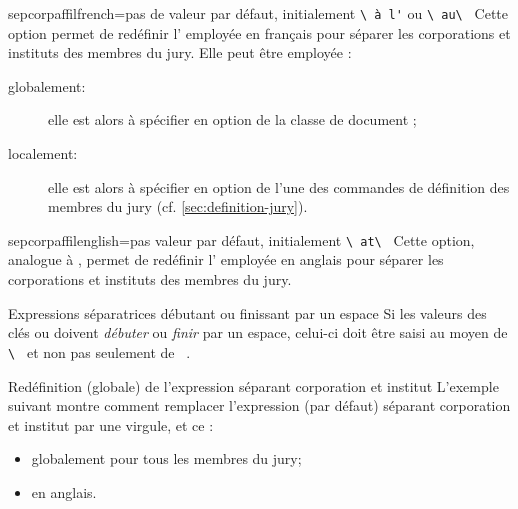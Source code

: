 \begin{docKey}{sepcorpaffilfrench}{=}{pas de valeur par
    défaut, initialement \lstinline[showspaces]+\ à l'+ ou \lstinline[showspaces]+\ au\ +}
  Cette option permet de redéfinir l' employée en français
  pour séparer les corporations et instituts des membres du jury. Elle peut
  être employée :
  \begin{description}
  \item[globalement:] elle est alors à spécifier en option de la classe de
    document ;
  \item[localement:] elle est alors à spécifier en option de l'une des
    commandes de définition des membres du jury (cf.
    \vref{sec:definition-jury}).
  \end{description}
\end{docKey}

\begin{docKey}{sepcorpaffilenglish}{=}{pas valeur par
    défaut, initialement \lstinline[showspaces]+\ at\ +}
  Cette option, analogue à , permet de redéfinir
  l' employée en anglais pour séparer les corporations et
  instituts des membres du jury.
\end{docKey}

\begin{dbwarning}{Expressions séparatrices débutant ou finissant par un espace}{}
  Si les valeurs des clés  ou
   doivent \emph{débuter} ou \emph{finir} par un
  espace, celui-ci doit être saisi au moyen de
  \lstinline[showspaces]+\ +
  et non pas seulement de
  \lstinline[showspaces]+ +.
\end{dbwarning}

\begin{dbexample}{Redéfinition (globale) de l'expression séparant corporation et
    institut}{}
  L'exemple suivant montre comment remplacer l'expression (par défaut) séparant
  corporation et institut par une virgule, et ce :
  \begin{itemize}
  \item globalement pour tous les membres du jury;
  \item en anglais.
  \end{itemize}
\end{dbexample}

